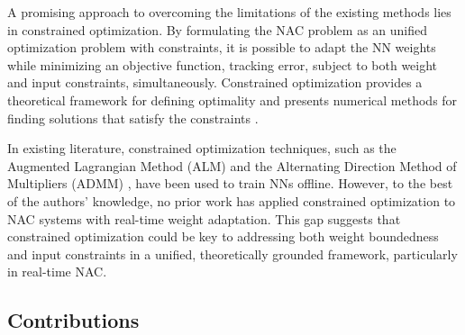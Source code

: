\documentclass[letterpaper, journal]{IEEEtran}
\newcommand{\ctxt}[2]{\color{#1}#2\color{black}}
\begin{document}

A promising approach to overcoming the limitations of the existing methods lies in constrained optimization.
By formulating the NAC problem as an unified optimization problem with constraints, it is possible to adapt the NN weights while minimizing an objective function, \eg tracking error, subject to both weight and input constraints, simultaneously.
Constrained optimization provides a theoretical framework for defining optimality and presents numerical methods for finding solutions that satisfy the constraints \cite{Nocedal:2006aa}.

In existing literature, constrained optimization techniques, such as the Augmented Lagrangian Method (ALM) \cite{Evens:2021aa} and the Alternating Direction Method of Multipliers (ADMM) \cite{Wang:2019aa,Taylor:2016aa}, have been used to train NNs offline. 
However, to the best of the authors' knowledge, no prior work has applied constrained optimization to NAC systems with real-time weight adaptation. 
This gap suggests that constrained optimization could be key to addressing both weight boundedness and input constraints in a unified, theoretically grounded framework, particularly in real-time NAC.

\subsection{Contributions}
\end{document}

